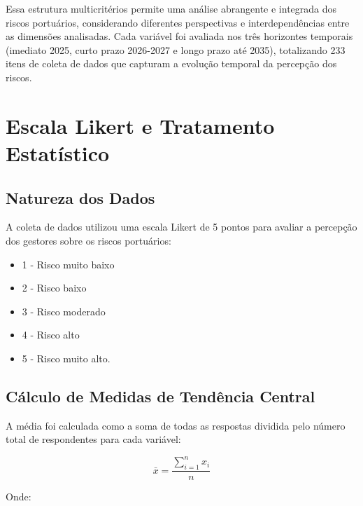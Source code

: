 \documentclass[
  portuguese,
  letterpaper,
  DIV=11,
  numbers=noendperiod]{scrreprt}
\providecommand{\tightlist}{%
  \setlength{\itemsep}{0pt}\setlength{\parskip}{0pt}}
\begin{document}
Essa estrutura multicritérios permite uma análise abrangente e integrada
dos riscos portuários, considerando diferentes perspectivas e
interdependências entre as dimensões analisadas. Cada variável foi
avaliada nos três horizontes temporais (imediato 2025, curto prazo
2026-2027 e longo prazo até 2035), totalizando 233 itens de coleta de
dados que capturam a evolução temporal da percepção dos riscos.

\section{Escala Likert e Tratamento
Estatístico}\label{escala-likert-e-tratamento-estatuxedstico}

\subsection{Natureza dos Dados}\label{natureza-dos-dados}

A coleta de dados utilizou uma escala Likert de 5 pontos para avaliar a
percepção dos gestores sobre os riscos portuários:

\begin{itemize}
\tightlist
\item
  1 - Risco muito baixo
\item
  2 - Risco baixo
\item
  3 - Risco moderado
\item
  4 - Risco alto
\item
  5 - Risco muito alto.
\end{itemize}

\subsection{Cálculo de Medidas de Tendência
Central}\label{cuxe1lculo-de-medidas-de-tenduxeancia-central}

A média foi calculada como a soma de todas as respostas dividida pelo
número total de respondentes para cada variável:

\[\bar{x} = \frac{\sum_{i=1}^{n} x_i}{n}\]

Onde:
\end{document}
